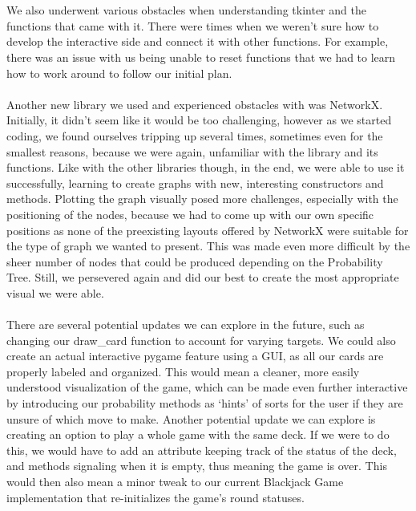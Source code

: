 \documentclass[fontsize=11pt]{article}
\begin{document}
\\\\
We also underwent various obstacles when understanding tkinter and the functions that came with it. There were times when we weren’t sure how to develop the interactive side and connect it with other functions. For example, there was an issue with us being unable to reset functions that we had to learn how to work around to follow our initial plan.
\\\\
Another new library we used and experienced obstacles with was NetworkX. Initially, it didn’t seem like it would be too challenging, however as we started coding, we found ourselves tripping up several times, sometimes even for the smallest reasons, because we were again, unfamiliar with the library and its functions. Like with the other libraries though, in the end, we were able to use it successfully, learning to create graphs with new, interesting constructors and methods. Plotting the graph visually posed more challenges, especially with the positioning of the nodes, because we had to come up with our own specific positions as none of the preexisting layouts offered by NetworkX were suitable for the type of graph we wanted to present. This was made even more difficult by the sheer number of nodes that could be produced depending on the Probability Tree. Still, we persevered again and did our best to create the most appropriate visual we were able.
\\\\
There are several potential updates we can explore in the future, such as changing our draw\_card function to account for varying targets. We could also create an actual interactive pygame feature using a GUI, as all our cards are properly labeled and organized. This would mean a cleaner, more easily understood visualization of the game, which can be made even further interactive by introducing our probability methods as ‘hints’ of sorts for the user if they are unsure of which move to make. Another potential update we can explore is creating an option to play a whole game with the same deck. If we were to do this, we would have to add an attribute keeping track of the status of the deck, and methods signaling when it is empty, thus meaning the game is over. This would then also mean a minor tweak to our current Blackjack Game implementation that re-initializes the game’s round statuses.
\end{document}

